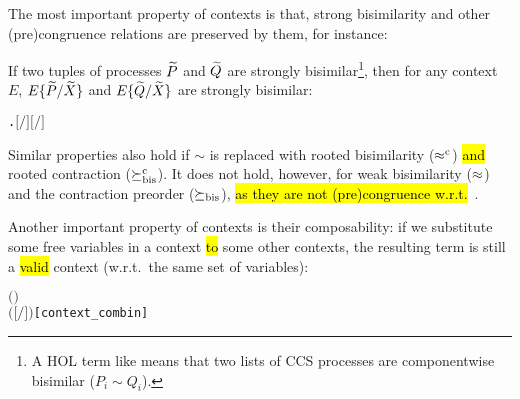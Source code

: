 The most important property of \multivariate contexts is that, strong bisimilarity
and other (pre)congruence relations are preserved by them, for instance:
\begin{lemma}
If two tuples of processes $\widetilde P$ and $\widetilde Q$ are strongly
bisimilar\footnote{A HOL term like 
  means that two lists of CCS processes are componentwise
  bisimilar ($P_i \sim Q_i$).}, then
for any context $E$, $E\{\widetilde P/\widetilde X\}$ and
$E\{\widetilde Q/\widetilde X\}$ are strongly bisimilar:
\begin{alltt}
\HOLTokenTurnstile{}   \HOLSymConst{\HOLTokenConj{}}   \HOLSymConst{\ensuremath{=}}   \HOLSymConst{\HOLTokenConj{}}  \HOLSymConst{\HOLTokenStrongEQ}  \HOLSymConst{\HOLTokenImp{}}
   \HOLSymConst{\HOLTokenForall{}}.    \HOLSymConst{\HOLTokenImp{}} \ensuremath{[}\ensuremath{/}\ensuremath{]}  \HOLSymConst{\HOLTokenStrongEQ} \ensuremath{[}\ensuremath{/}\ensuremath{]} 
\end{alltt}
\end{lemma}
%
Similar properties also hold if $\sim$ is replaced with rooted
bisimilarity ($\mathrel{\approx^{\rm{c}}}$) \hl{and} rooted contraction ($\mathrel{\succeq^{\rm{c}}_{\rm{bis}}}$). It does
not hold, however, for weak bisimilarity ($\approx$) and the contraction
preorder ($\mathrel{\succeq_{\rm{bis}}}$), \hl{as they are not (pre)congruence
w.r.t.}~.

Another important property of contexts is their composability: if we
substitute some free variables in a context \hl{to} some other contexts, the
resulting term is still a \hl{valid} context (w.r.t.~the same set of variables):
\begin{alltt}
\HOLTokenTurnstile{}   \HOLSymConst{\HOLTokenConj{}}    \HOLSymConst{\HOLTokenConj{}}  \ensuremath{(} \ensuremath{)}  \HOLSymConst{\HOLTokenConj{}}
     \HOLSymConst{\ensuremath{=}}   \HOLSymConst{\HOLTokenImp{}}
     \ensuremath{(}\ensuremath{[}\ensuremath{/}\ensuremath{]} \ensuremath{)}\hfill{[context_combin]}
\end{alltt}

